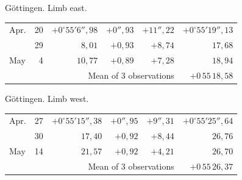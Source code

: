 \noindent\begin{minipage}[t]{.495\textwidth}\centering Göttingen. Limb east.\par\smallskip
{\scriptsize\setlength{\tabcolsep}{1pt}\renewcommand{\arraystretch}{1.2}\begin{tabular}{lr|r|r|r|r|}
Apr.&20&$+0^\circ55'6''{,}98$&$+0''{,}93$&$+11''{,}22$&$+0^\circ55'19''{,}13$\\
&29&$8{,}01$&$+0{,}93$&$+8{,}74$&$17{,}68$\\
May&4&$10{,}77$&$+0{,}89$&$+7{,}28$&$18{,}94$\\
\cline{6-6}\multicolumn{5}{r}{Mean of 3 observations}&$+0\,55\,18{,}58$
\end{tabular}}\end{minipage}\hfill\begin{minipage}[t]{.495\textwidth}\centering Göttingen. Limb west.\par\smallskip
{\scriptsize\setlength{\tabcolsep}{1pt}\renewcommand{\arraystretch}{1.2}\begin{tabular}{lr|r|r|r|r}
Apr.&27&$+0^\circ55'15''{,}38$&$+0''{,}95$&$+9''{,}31$&$+0^\circ55'25''{,}64$\\
&30&$17{,}40$&$+0{,}92$&$+8{,}44$&$26{,}76$\\
May&14&$21{,}57$&$+0{,}92$&$+4{,}21$&$26{,}70$\\
\cline{6-6}\multicolumn{5}{r}{Mean of 3 observations}&$+0\,55\,26{,}37$
\end{tabular}}\end{minipage}
\par\vspace{4mm}


